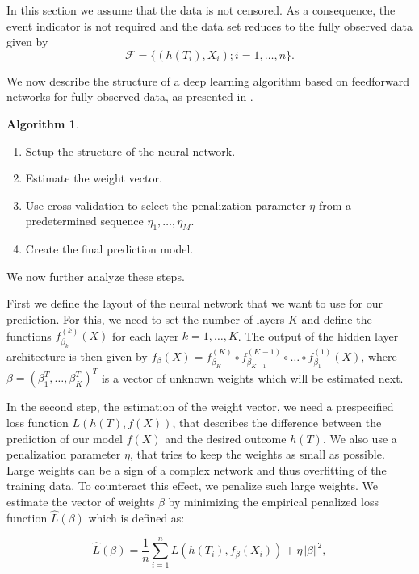 \documentclass[12pt, a4paper]{article}
\theoremstyle{definition}
\newtheorem{Algorithm}{Algorithm}[section]
\theoremstyle{plain}
\numberwithin{equation}{section}
\numberwithin{figure}{section}
\numberwithin{table}{section}
\begin{document}
	In this section we assume that the data is not censored.
	As a consequence, the event indicator is not required and the data set reduces to the fully observed data given by
	\begin{equation*}
	\mathcal{F} =\{ \left( h(T_i), X_i\right); i = 1, \dots, n\}.
	\end{equation*}
	
	We now describe the structure of a deep learning algorithm based on feedforward networks for fully observed data, as presented in \citet*{basearticle}.
	
	\begin{Algorithm}\label{alg:nocensor}
		~
	\begin{enumerate}
		\item Setup the structure of the neural network.
		\item Estimate the weight vector.
		\item Use cross-validation to select the penalization parameter $\eta$ from a predetermined sequence $\eta_1,\dots,\eta_M$.
		\item Create the final prediction model.
	\end{enumerate}
	\end{Algorithm}

	We now further analyze these steps.

	First we define the layout of the neural network that we want to use for our prediction.
	For this, we need to set the number of layers $K$ and define the functions $f_{\beta_k}^{(k)}(X)$ for each layer $k = 1, \dots, K$.
	The output of the hidden layer architecture is then given by $f_{\beta}(X) = f_{\beta_K}^{(K)} \circ f_{\beta_{K-1}}^{(K-1)} \circ \dots \circ f_{\beta_1}^{(1)}(X)$, where $\beta = (\beta_1^T, \dots, \beta_K^T)^T$ is a vector of unknown weights which will be estimated next.
	
	In the second step, the estimation of the weight vector, we need a prespecified loss function $L(h(T), f(X))$, that describes the difference between the prediction of our model $f(X)$ and the desired outcome $h(T)$.
	We also use a penalization parameter $\eta$, that tries to keep the weights as small as possible.
	Large weights can be a sign of a complex network and thus overfitting of the training data.
	To counteract this effect, we penalize such large weights.
	We estimate the vector of weights $\beta$ by minimizing the empirical penalized loss function $\hat{L}(\beta)$ which is defined as:
	
	\begin{equation}\label{eq:eplf}
	\hat{L}(\beta) = \frac{1}{n} \sum_{i=1}^n L( h(T_i), f_{\beta}(X_i)) + \eta \Vert \beta \Vert ^2,
	\end{equation}
	
\end{document}

